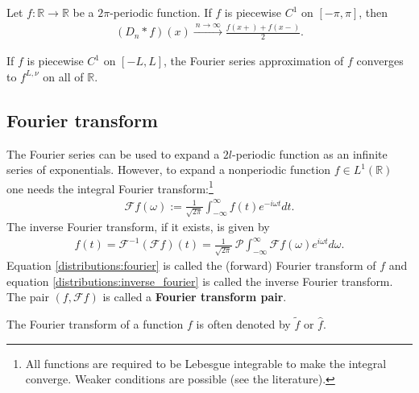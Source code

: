     \begin{property}
       	Let $f:\mathbb{R}\rightarrow\mathbb{R}$ be a $2\pi$-periodic function. If $f$ is piecewise $C^1$ on $[-\pi,\pi]$, then
        \begin{gather}
            (D_n\ast f)(x)\xrightarrow{\ n\longrightarrow\infty\ }\frac{f(x+)+f(x-)}{2}.
        \end{gather}
    \end{property}

    \begin{property}
    	If $f$ is piecewise $C^1$ on $[-L,L]$, the Fourier series approximation of $f$ converges to $f^{L,\nu}$ on all of $\mathbb{R}$.
    \end{property}

\subsection{Fourier transform}

    The Fourier series can be used to expand a $2l$-periodic function as an infinite series of exponentials. However, to expand a nonperiodic function $f\in L^1(\mathbb{R})$ one needs the integral Fourier transform:\footnote{All functions are required to be Lebesgue integrable to make the integral converge. Weaker conditions are possible (see the literature).}
    \begin{gather}
        \label{distributions:fourier}
        \mathcal{F}f(\omega) := \frac{1}{\sqrt{2\pi}}\int_{-\infty}^\infty f(t)e^{-i\omega t}dt.
    \end{gather}
    The inverse Fourier transform, if it exists, is given by
    \begin{gather}
        \label{distributions:inverse_fourier}
        f(t) = \mathcal{F}^{-1}(\mathcal{F}f)(t) = \frac{1}{\sqrt{2\pi}}\  \mathcal{P}\int_{-\infty}^\infty\mathcal{F}f(\omega)e^{i\omega t}d\omega.
    \end{gather}
    Equation \eqref{distributions:fourier} is called the (forward) Fourier transform of $f$ and equation \eqref{distributions:inverse_fourier} is called the inverse Fourier transform. The pair $(f,\mathcal{F}f)$ is called a \textbf{Fourier transform pair}.
    \begin{notation}
        The Fourier transform of a function $f$ is often denoted by $\widetilde{f}$ or $\widehat{f}$.
    \end{notation}


